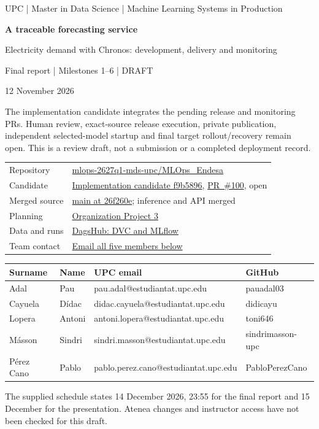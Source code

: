 \documentclass[a4paper,11pt]{article}
\newcommand{\repo}{https://github.com/mlops-2627q1-mds-upc/MLOps_Endesa}
\newcommand{\candidate}{f9b5896af998331494175733c557e8dc5dd12cc7}
\newcommand{\pr}[1]{\href{\repo/pull/#1}{PR~\##1}}
\begin{document}
\begin{titlepage}
\thispagestyle{empty}
{\large UPC | Master in Data Science | Machine Learning Systems in Production\par}
\vspace{1.3cm}
{\Huge\bfseries A traceable forecasting service\par}
\vspace{0.4cm}
{\Large Electricity demand with Chronos: development, delivery and monitoring\par}
\vspace{0.8cm}
{\Large Final report | Milestones 1--6 | DRAFT\par}
12 November 2026
\vspace{0.6cm}

The implementation candidate integrates the pending release and monitoring PRs.
Human review, exact-source release execution, private publication, independent
selected-model startup and final target rollout/recovery remain open. This is a
review draft, not a submission or a completed deployment record.

\vspace{0.4cm}
\begin{tabularx}{\linewidth}{@{}lY@{}}
Repository & \href{\repo}{mlops-2627q1-mds-upc/MLOps\_Endesa} \\
Candidate & \href{\repo/tree/\candidate}{Implementation candidate f9b5896}, \pr{100}, open \\
Merged source & \href{\repo/tree/26f260e33766689bcdce4a6db6062a9e1e74475d}{main at 26f260e}; inference and API merged \\
Planning & \href{https://github.com/orgs/mlops-2627q1-mds-upc/projects/3}{Organization Project 3} \\
Data and runs & \href{https://dagshub.com/pauadal03/MLOps_Endesa}{DagsHub: DVC and MLflow} \\
Team contact & \href{mailto:pau.adal@estudiantat.upc.edu,didac.cayuela@estudiantat.upc.edu,antoni.lopera@estudiantat.upc.edu,sindri.masson@estudiantat.upc.edu,pablo.perez.cano@estudiantat.upc.edu}{Email all five members below} \\
\end{tabularx}
\vspace{0.5cm}
{\small
\begin{tabularx}{\linewidth}{@{}llYl@{}}\toprule
Surname & Name & UPC email & GitHub \\\midrule
Adal & Pau & pau.adal@estudiantat.upc.edu & pauadal03 \\
Cayuela & Dídac & didac.cayuela@estudiantat.upc.edu & didicayu \\
Lopera & Antoni & antoni.lopera@estudiantat.upc.edu & toni646 \\
Másson & Sindri & sindri.masson@estudiantat.upc.edu & sindrimasson-upc \\
Pérez Cano & Pablo & pablo.perez.cano@estudiantat.upc.edu & PabloPerezCano \\\bottomrule
\end{tabularx}}
\vfill
The supplied schedule states 14 December 2026, 23:55 for the final report and
15 December for the presentation. Atenea changes and instructor access have not
been checked for this draft.
\end{titlepage}
\tableofcontents
\clearpage
\end{document}
